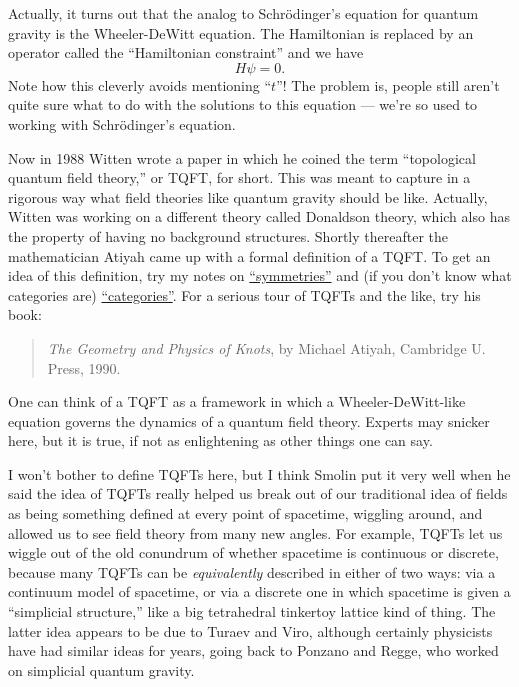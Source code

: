\documentclass{article}
\begin{document}
Actually, it turns out that the analog to Schr\"odinger's equation for
quantum gravity is the Wheeler-DeWitt equation. The Hamiltonian is
replaced by an operator called the ``Hamiltonian constraint'' and we
have \[H\psi = 0.\] Note how this cleverly avoids mentioning ``\(t\)''!
The problem is, people still aren't quite sure what to do with the
solutions to this equation --- we're so used to working with
Schr\"odinger's equation.

Now in 1988 Witten wrote a paper in which he coined the term
``topological quantum field theory,'' or TQFT, for short. This was meant
to capture in a rigorous way what field theories like quantum gravity
should be like. Actually, Witten was working on a different theory
called Donaldson theory, which also has the property of having no
background structures. Shortly thereafter the mathematician Atiyah came
up with a formal definition of a TQFT. To get an idea of this
definition, try my notes on
\href{http://math.ucr.edu/home/baez/symmetries.html}{``symmetries''} and
(if you don't know what categories are)
\href{http://math.ucr.edu/home/baez/categories.html}{``categories''}.
For a serious tour of TQFTs and the like, try his book:

\begin{quote}
\emph{The Geometry and Physics of Knots}, by Michael Atiyah, Cambridge
U. Press, 1990.
\end{quote}

One can think of a TQFT as a framework in which a Wheeler-DeWitt-like
equation governs the dynamics of a quantum field theory. Experts may
snicker here, but it is true, if not as enlightening as other things one
can say.

I won't bother to define TQFTs here, but I think Smolin put it very well
when he said the idea of TQFTs really helped us break out of our
traditional idea of fields as being something defined at every point of
spacetime, wiggling around, and allowed us to see field theory from many
new angles. For example, TQFTs let us wiggle out of the old conundrum of
whether spacetime is continuous or discrete, because many TQFTs can be
\emph{equivalently} described in either of two ways: via a continuum
model of spacetime, or via a discrete one in which spacetime is given a
``simplicial structure,'' like a big tetrahedral tinkertoy lattice kind
of thing. The latter idea appears to be due to Turaev and Viro, although
certainly physicists have had similar ideas for years, going back to
Ponzano and Regge, who worked on simplicial quantum gravity.
\end{document}

